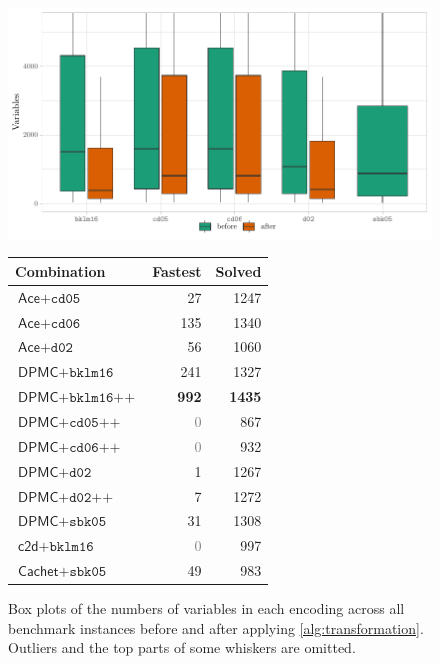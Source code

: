 \begin{figure}
  \centering
  \begin{minipage}{0.49\textwidth}
    \centering
    \includegraphics[width=\textwidth]{chapters/wmc_without_parameters/box}
    \caption{Box plots of the numbers of variables in each encoding across all
      benchmark instances before and after applying \cref{alg:transformation}.
      Outliers and the top parts of some whiskers are
      omitted.}\label{fig:box}
  \end{minipage}\hfill
  \begin{minipage}{0.49\textwidth}
    \centering
    \label{tbl:performance}
    \begin{tabular}{lrr}
      \toprule
      Combination & Fastest & Solved \\
      \midrule
      $\textsf{Ace} + \texttt{cd05}$ & 27 & 1247 \\
      $\textsf{Ace} + \texttt{cd06}$ & 135 & 1340 \\
      $\textsf{Ace} + \texttt{d02}$ & 56 & 1060 \\
      $\textsf{DPMC} + \texttt{bklm16}$ & 241 & 1327 \\
      $\textsf{DPMC} + \texttt{bklm16++}$ & \textbf{992} & \textbf{1435} \\
      $\textsf{DPMC} + \texttt{cd05++}$ & \textcolor{gray}{0} & 867 \\
      $\textsf{DPMC} + \texttt{cd06++}$ & \textcolor{gray}{0} & 932 \\
      $\textsf{DPMC} + \texttt{d02}$ & 1 & 1267 \\
      $\textsf{DPMC} + \texttt{d02++}$ & 7 & 1272 \\
      $\textsf{DPMC} + \texttt{sbk05}$ & 31 & 1308 \\
      $\textsf{c2d} + \texttt{bklm16}$ & \textcolor{gray}{0} & 997 \\
      $\textsf{Cachet} + \texttt{sbk05}$ & 49 & 983 \\
      \bottomrule
    \end{tabular}
  \end{minipage}
\end{figure}

